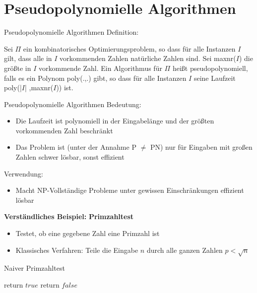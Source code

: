 \section{Pseudopolynomielle Algorithmen}

\begin{frame}{Pseudopolynomielle Algorithmen}
Definition:

Sei $\Pi$ ein kombinatorisches Optimierungsproblem, so dass für alle Instanzen $I$ gilt, dass alle in $I$ vorkommenden Zahlen natürliche Zahlen sind. Sei maxnr($I$) die größte in $I$ vorkommende Zahl. Ein Algorithmus für $\Pi$ heißt pseudopolynomiell, falls es ein Polynom poly(.,.)  gibt, so 
dass für alle Instanzen $I$ seine Laufzeit poly(|$I$| ,maxnr($I$)) ist. 

\end{frame}
\begin{frame}{Pseudopolynomielle Algorithmen}
Bedeutung:

\begin{itemize}
\item
Die Laufzeit ist polynomiell in der Eingabelänge und der größten vorkommenden Zahl beschränkt

\item
Das Problem ist (unter der Annahme P $\neq$ PN) nur für Eingaben mit großen Zahlen schwer lösbar, sonst effizient

\end{itemize}

Verwendung:
\begin{itemize}
\item
Macht NP-Vollständige Probleme unter gewissen Einschränkungen effizient lösbar

\end{itemize}
\end{frame}

\begin{frame}
\textbf{Verständliches Beispiel:}
\textbf{Primzahltest}

\begin{itemize}
\item
Testet, ob eine gegebene Zahl eine Primzahl ist
\item
Klassisches Verfahren: Teile die Eingabe $n$ durch alle ganzen Zahlen $p < \sqrt{n}$
\end{itemize}

\begin{algorithm}[H]
\caption{Naiver Primzahltest}
    \begin{algorithmic}
                  	\State return $true$
            \Else
                  	\State return $false$
            \EndIf
            \EndFor
        \EndFunction
    \end{algorithmic}
\end{algorithm}
\end{frame}

